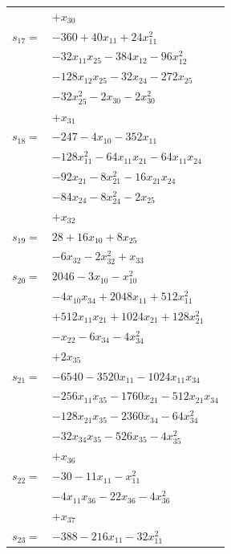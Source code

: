 \begin{longtable}{@{}r@{\;}l@{}}
 & \(\displaystyle +x_{30}\) \\[3pt]
\(s_{17}=\) & \(\displaystyle -360 +40x_{11} +24x_{11}^{2}\) \\
 & \(\displaystyle -32x_{11}x_{25} -384x_{12} -96x_{12}^{2}\) \\
 & \(\displaystyle -128x_{12}x_{25} -32x_{24} -272x_{25}\) \\
 & \(\displaystyle -32x_{25}^{2} -2x_{30} -2x_{30}^{2}\) \\
 & \(\displaystyle +x_{31}\) \\[3pt]
\(s_{18}=\) & \(\displaystyle -247 -4x_{10} -352x_{11}\) \\
 & \(\displaystyle -128x_{11}^{2} -64x_{11}x_{21} -64x_{11}x_{24}\) \\
 & \(\displaystyle -92x_{21} -8x_{21}^{2} -16x_{21}x_{24}\) \\
 & \(\displaystyle -84x_{24} -8x_{24}^{2} -2x_{25}\) \\
 & \(\displaystyle +x_{32}\) \\[3pt]
\(s_{19}=\) & \(\displaystyle 28 +16x_{10} +8x_{25}\) \\
 & \(\displaystyle -6x_{32} -2x_{32}^{2} +x_{33}\) \\[3pt]
\(s_{20}=\) & \(\displaystyle 2046 -3x_{10} -x_{10}^{2}\) \\
 & \(\displaystyle -4x_{10}x_{34} +2048x_{11} +512x_{11}^{2}\) \\
 & \(\displaystyle +512x_{11}x_{21} +1024x_{21} +128x_{21}^{2}\) \\
 & \(\displaystyle -x_{22} -6x_{34} -4x_{34}^{2}\) \\
 & \(\displaystyle +2x_{35}\) \\[3pt]
\(s_{21}=\) & \(\displaystyle -6540 -3520x_{11} -1024x_{11}x_{34}\) \\
 & \(\displaystyle -256x_{11}x_{35} -1760x_{21} -512x_{21}x_{34}\) \\
 & \(\displaystyle -128x_{21}x_{35} -2360x_{34} -64x_{34}^{2}\) \\
 & \(\displaystyle -32x_{34}x_{35} -526x_{35} -4x_{35}^{2}\) \\
 & \(\displaystyle +x_{36}\) \\[3pt]
\(s_{22}=\) & \(\displaystyle -30 -11x_{11} -x_{11}^{2}\) \\
 & \(\displaystyle -4x_{11}x_{36} -22x_{36} -4x_{36}^{2}\) \\
 & \(\displaystyle +x_{37}\) \\[3pt]
\(s_{23}=\) & \(\displaystyle -388 -216x_{11} -32x_{11}^{2}\) \\

\end{longtable}

